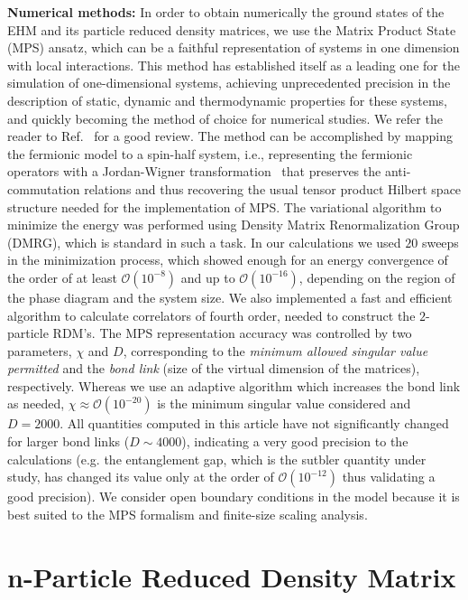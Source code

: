 \documentclass[prb,reprint,showpacs,twocolumn,superscriptaddress]{revtex4-2}
\begin{document}
\textbf{Numerical methods:} In order to obtain numerically the ground states of the EHM and its 
particle reduced density matrices, we use the Matrix Product State (MPS) ansatz, 
which can be a faithful representation of systems in one dimension with local interactions.
This method has established itself as a leading one for the simulation of one-dimensional systems, 
achieving unprecedented precision in the description of static, 
dynamic  and thermodynamic properties for these  systems, 
and quickly becoming the method of choice for numerical studies.
We refer the reader to Ref.~\cite{verstraete2008matrix} for a good review. 
The method can be accomplished by mapping the fermionic model to a spin-half system, i.e., 
representing the fermionic operators with a  Jordan-Wigner transformation~\cite{nielsen2005fermionic} 
that preserves the anti-commutation relations
and thus recovering the usual tensor product Hilbert space structure needed for the implementation of MPS. 
The variational algorithm to minimize the energy was performed using Density Matrix Renormalization Group (DMRG), 
which is standard in such a task. 
In our calculations we used $20$ sweeps in the minimization process, 
which showed enough for an energy convergence of the order of at least $\mathcal{O}(10^{-8})$ and up to 
$\mathcal{O}(10^{-16})$, depending on the region of the phase diagram and the system size.
We also implemented a fast and efficient algorithm to calculate correlators of fourth order, 
needed to construct the $2$-particle RDM's. 
The MPS representation accuracy was  controlled by two parameters, $\chi$ and $D$, 
corresponding to the \textit{minimum allowed singular value permitted} and the \textit{bond link} 
(size of the virtual dimension of the matrices), respectively. 
 Whereas we use an adaptive algorithm which increases the bond link as needed, 
$\chi \approx \mathcal{O}(10^{-20})$ is the minimum singular value considered
and $D=2000$.
All quantities computed in this article have not  significantly changed for larger bond links ($D\sim 4000$), indicating 
a very good precision to the calculations (e.g. the entanglement gap, which is the sutbler quantity under study, has changed its value only at the order of $\mathcal{O}(10^{-12})$ thus validating a good precision).
We consider open boundary conditions in the model because it is best suited to the MPS formalism and finite-size scaling analysis.

 
\section{n-Particle Reduced Density Matrix}
\label{sec.nparticle.rdm}
\end{document}
